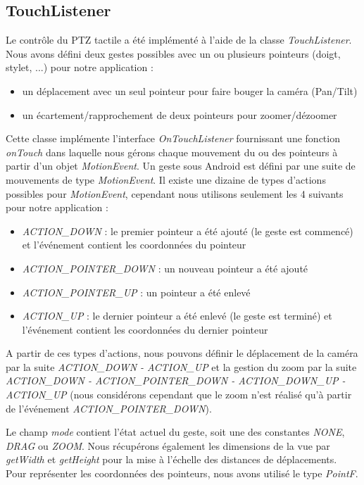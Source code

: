 \subsection{TouchListener}
Le contrôle du PTZ tactile a été implémenté à l'aide de la classe \textit{TouchListener}. Nous avons défini deux gestes possibles avec un ou plusieurs pointeurs (doigt, stylet, ...) pour notre application :
\begin{itemize}
\item un déplacement avec un seul pointeur pour faire bouger la caméra (Pan/Tilt)
\item un écartement/rapprochement de deux pointeurs pour zoomer/dézoomer
\end{itemize}
Cette classe implémente l'interface \textit{OnTouchListener} fournissant une fonction \textit{onTouch} dans laquelle nous gérons chaque mouvement du ou des pointeurs à partir d'un objet \textit{MotionEvent}. Un geste sous Android est défini par une suite de mouvements de type \textit{MotionEvent}.
Il existe une dizaine de types d'actions possibles pour \textit{MotionEvent}, cependant nous utilisons seulement les 4 suivants pour notre application :
\begin{itemize}
\item \textit{ACTION\_DOWN} : le premier pointeur a été ajouté (le geste est
commencé) et l'événement contient les coordonnées du pointeur
\item \textit{ACTION\_POINTER\_DOWN} : un nouveau pointeur a été ajouté
\item \textit{ACTION\_POINTER\_UP} : un pointeur a été enlevé
\item \textit{ACTION\_UP} : le dernier pointeur a été enlevé (le geste est
terminé) et l'événement contient les coordonnées du dernier pointeur
\end{itemize}
A partir de ces types d'actions, nous pouvons définir le déplacement de la
caméra par la suite \textit{ACTION\_DOWN - ACTION\_UP} et la gestion du zoom par
la suite
\textit{ACTION\_DOWN - ACTION\_POINTER\_DOWN - ACTION\_DOWN\_UP - ACTION\_UP}
(nous considérons cependant que le zoom n'est réalisé qu'à partir de l'événement
\textit{ACTION\_POINTER\_DOWN}).

Le champ \textit{mode} contient l'état actuel du geste, soit une des constantes \textit{NONE}, \textit{DRAG} ou \textit{ZOOM}.
Nous récupérons également les dimensions de la vue par \textit{getWidth} et \textit{getHeight} pour la mise à l'échelle des distances de déplacements. 
Pour représenter les coordonnées des pointeurs, nous avons utilisé le type \textit{PointF}.

